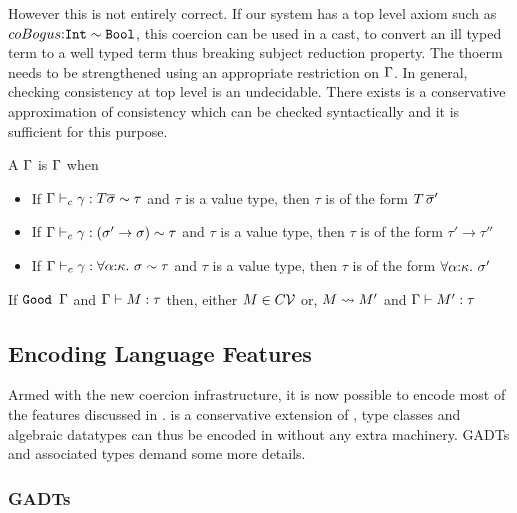 \documentclass[manuscript,screen,nonacm]{acmart}
\begin{document}
However this is not entirely correct. If our system has a top level axiom such as $coBogus {:} \texttt{Int} \sim \texttt{Bool}$, this coercion can be used in a cast, to convert an ill typed term to a well typed term thus breaking subject reduction property. The thoerm needs to be strengthened using an appropriate restriction on $\TEnv$. In general, checking consistency at top level is an undecidable. There exists is a conservative approximation of consistency which can be checked syntactically and it is sufficient for this purpose.

\begin{definition}[\Good $\TEnv$]
  A $\TEnv$ is \Good $\TEnv$ when
  \begin{itemize}
  \item If $\Gamma \vdash_{c} \gamma : T \overline{\sigma} \sim \tau$ and $\tau$ is a value type, then $\tau$ is of the form $T\,\overline{\sigma}'$
  \item If $\Gamma \vdash_{c} \gamma : (\sigma' \to \sigma) \sim \tau$ and $\tau$ is a value type, then $\tau$ is of the form $\tau' \to \tau''$
  \item If $\Gamma \vdash_{c} \gamma : \forall\alpha{:}\kappa.~\sigma \sim \tau$ and $\tau$ is a value type, then $\tau$ is of the form $\forall\alpha{:}\kappa.~\sigma'$
  \end{itemize}
\end{definition}

\begin{theorem}\label{thm:progress}
  If $\texttt{Good }\Gamma$ and $\Gamma \vdash M : \tau$ then, either $M \in C\mathcal{V}$ or, $M \rightsquigarrow M'$ and
  $\Gamma \vdash M' : \tau$
\end{theorem}

\subsection{Encoding Language Features}

Armed with the new coercion infrastructure, it is now possible to encode most of the features discussed in . \SFC is a conservative extension of \SF, type classes and algebraic datatypes can thus be encoded in \SFC without any extra machinery. GADTs and associated types demand some more details.

\subsubsection{GADTs}
\end{document}
